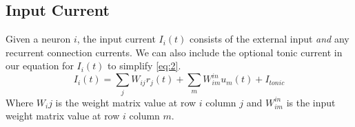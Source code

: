 \documentclass[11pt]{article}
\theoremstyle{definition}
\theoremstyle{remark}
\begin{document}
    \subsection{Input Current}
    Given a neuron $i$, the input current $I_i(t)$ consists of the external input \textit{and} any recurrent connection currents. We can also include the optional tonic current in our equation for $I_i(t)$ to simplify \ref{eq:2}.
    \begin{equation}\label{eqn:I1}
        I_i(t) = \sum_{j}W_{ij}r_j(t) + \sum_{m}W_{im}^{in} u_m(t) + I_{tonic}
    \end{equation}
    Where $W_ij$ is the weight matrix value at row $i$ column $j$ and $W^{in}_{im}$ is the input weight matrix value at row $i$ column $m$.
\end{document}
